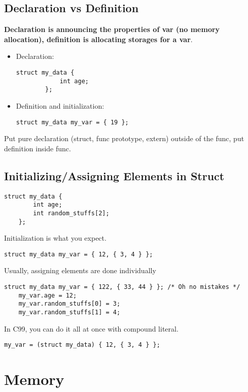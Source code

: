 \documentclass{article}
\begin{document}
\subsection{Declaration vs Definition}
\textbf{Declaration is announcing the properties of var (no memory allocation), definition is allocating storages for a var}.
\begin{itemize}
    \item Declaration:
    \begin{lstlisting}[style=CStyle]
        struct my_data {
            int age;
        };
    \end{lstlisting}
    \item Definition and initialization:
    \begin{lstlisting}[style=CStyle]
        struct my_data my_var = { 19 };
    \end{lstlisting}
\end{itemize}
Put pure declaration (struct, func prototype, extern) outside of the func, put definition inside func.

\subsection{Initializing/Assigning Elements in Struct}
\begin{lstlisting}[style=CStyle]
    struct my_data {
        int age;
        int random_stuffs[2];
    };
\end{lstlisting}
Initialization is what you expect.
\begin{lstlisting}[style=CStyle]
    struct my_data my_var = { 12, { 3, 4 } };
\end{lstlisting}
Usually, assigning elements are done individually
\begin{lstlisting}[style=CStyle]
    struct my_data my_var = { 122, { 33, 44 } }; /* Oh no mistakes */
    my_var.age = 12;
    my_var.random_stuffs[0] = 3;
    my_var.random_stuffs[1] = 4;
\end{lstlisting}
In C99, you can do it all at once with compound literal.
\begin{lstlisting}[style=CStyle]
    my_var = (struct my_data) { 12, { 3, 4 } };
\end{lstlisting}

\section{Memory}
\end{document}
